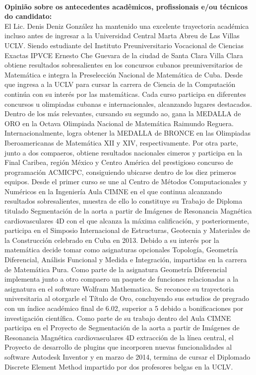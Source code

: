 \documentclass[11pt]{article}
\begin{document}
\\
\textbf{Opinião sobre os antecedentes acadêmicos, profissionais e/ou técnicos do candidato:}
\\El Lic. Denis Deniz González ha mantenido una excelente trayectoria académica incluso antes de ingresar a la Universidad Central Marta Abreu de Las Villas UCLV. Siendo estudiante del Instituto Preuniversitario Vocacional de Ciencias Exactas IPVCE Ernesto Che Guevara de la ciudad de Santa Clara Villa Clara obtiene resultados sobresalientes en los concursos cubanos preuniversitarios de Matemática  e integra la Preselección Nacional de Matemática de Cuba.
Desde que ingresa a la UCLV para cursar la carrera de Ciencia de la Computación continúa con su interés por las matemáticas. Cada curso participa en diferentes concursos u olimpiadas cubanas e internacionales, alcanzando lugares destacados. Dentro de los más relevantes, cursando su segundo ao, gana la MEDALLA de ORO en la Octava Olimpiada Nacional de Matemática Raimundo Reguera. Internacionalmente, logra obtener la MEDALLA de BRONCE en las Olimpiadas Iberoamericanas de Matemática XII y XIV, respectivamente. Por otra parte, junto a dos compaeros, obtiene resultados nacionales cimeros y participa en la Final Caribea, región México y Centro América del prestigioso concurso de programación ACMICPC, consiguiendo ubicarse dentro de los diez primeros equipos.
Desde el primer curso se une al Centro de Métodos Computacionales y Numéricos en la Ingeniería Aula CIMNE en el que continua alcanzando resultados sobresalientes, muestra de ello lo constituye su Trabajo de Diploma titulado Segmentación de la aorta a partir de Imágenes de Resonancia Magnética cardiovasculares 4D con el que alcanza la máxima calificación, y posteriormente, participa en el Simposio Internacional de Estructuras, Geotecnia y Materiales de la Construcción celebrado en Cuba en 2013.
Debido a su interés por la matemática decide tomar como asignaturas opcionales Topología, Geometría Diferencial, Análisis Funcional y Medida e Integración, impartidas en la carrera de Matemática Pura. Como parte de la asignatura Geometría Diferencial implementa junto a otro compaero un paquete de funciones relacionadas a la asignatura en el software Wolfram Mathematica.
Se reconoce su trayectoria universitaria al otorgarle el Título de Oro, concluyendo sus estudios de pregrado con un índice académico final de 6.02, superior a 5 debido a bonificaciones por investigación científica.
Como parte de su trabajo dentro del Aula CIMNE participa en el Proyecto de Segmentación de la aorta a partir de Imágenes de Resonancia Magnética cardiovasculares 4D extracción de la línea central, el Proyecto de desarrollo de plugins que incorporen nuevas funcionalidades al software Autodesk Inventor y en marzo de 2014, termina de cursar el Diplomado Discrete Element Method impartido por dos profesores belgas en la UCLV.\\
\end{document}

